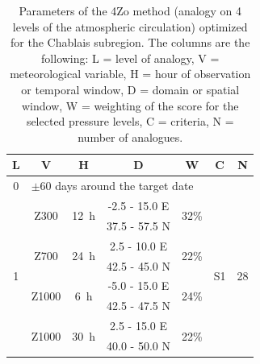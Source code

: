 \documentclass[review]{elsarticle}
\begin{document}
\begin{table}[htb]
	\caption{Parameters of the 4Zo method (analogy on 4 levels of the atmospheric circulation) optimized for the Chablais subregion. The columns are the following: L = level of analogy, V = meteorological variable, H = hour of observation or temporal window, D = domain or spatial window, W = weighting of the score for the selected pressure levels, C = criteria, N = number of analogues.}
	\footnotesize
	\begin{center}
		\begin{tabular}{ccccccc}
			\hline L & V & H & D & W & C & N \\ 
			\hline 
			0 & \multicolumn{6}{l}{$\pm 60$ days around the target date} \\
			\hline 
			\multirow{8}{*}{1} &  \multirow{2}{*}{Z300} & \multirow{2}{*}{12~h} & -2.5 - 15.0 \degree E & \multirow{2}{*}{32\%} & \multirow{8}{*}{S1} & \multirow{8}{*}{28} \\
			& & & 37.5 - 57.5 \degree N & & & \\ 
			& \multirow{2}{*}{Z700} & \multirow{2}{*}{24~h} & 2.5 - 10.0 \degree E & \multirow{2}{*}{22\%} & & \\ 
			& & & 42.5 - 45.0 \degree N & & & \\ 
			& \multirow{2}{*}{Z1000} & \multirow{2}{*}{6~h} & -5.0 - 15.0 \degree E & \multirow{2}{*}{24\%} & & \\ 
			& & & 42.5 - 47.5 \degree N & & & \\ 
			& \multirow{2}{*}{Z1000} & \multirow{2}{*}{30~h} & 2.5 - 15.0 \degree E & \multirow{2}{*}{22\%} & & \\ 
			& & & 40.0 - 50.0 \degree N & & & \\ 
			\hline 
		\end{tabular} 
	\end{center}
	\label{table:params_GA_4Zo}
\end{table}
\end{document}
